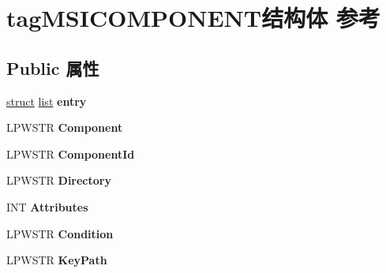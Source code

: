 \hypertarget{structtag_m_s_i_c_o_m_p_o_n_e_n_t}{}\section{tag\+M\+S\+I\+C\+O\+M\+P\+O\+N\+E\+N\+T结构体 参考}
\label{structtag_m_s_i_c_o_m_p_o_n_e_n_t}
\subsection*{Public 属性}
\begin{DoxyCompactItemize}
\item 
\mbox{\label{structtag_m_s_i_c_o_m_p_o_n_e_n_t_a9efeaa4a91aac674706fe3258ff213a9}} 
\hyperlink{interfacestruct}{struct} \hyperlink{classlist}{list} {\bfseries entry}
\item 
\mbox{\label{structtag_m_s_i_c_o_m_p_o_n_e_n_t_a07585d562875d0ee2a2c725a46d3be1d}} 
L\+P\+W\+S\+TR {\bfseries Component}
\item 
\mbox{\label{structtag_m_s_i_c_o_m_p_o_n_e_n_t_a893386b13b5175bab2abe437631274aa}} 
L\+P\+W\+S\+TR {\bfseries Component\+Id}
\item 
\mbox{\label{structtag_m_s_i_c_o_m_p_o_n_e_n_t_ae54cce95a94d71254831aacfcfa97674}} 
L\+P\+W\+S\+TR {\bfseries Directory}
\item 
\mbox{\label{structtag_m_s_i_c_o_m_p_o_n_e_n_t_a51cb664c63c21d3027f7cb9a23942cb9}} 
I\+NT {\bfseries Attributes}
\item 
\mbox{\label{structtag_m_s_i_c_o_m_p_o_n_e_n_t_ad1c35e54cbb938fdd2303d417c12cbd7}} 
L\+P\+W\+S\+TR {\bfseries Condition}
\item 
\mbox{\label{structtag_m_s_i_c_o_m_p_o_n_e_n_t_aa523554c3e7004ebdc6fa72808198a7d}} 
L\+P\+W\+S\+TR {\bfseries Key\+Path}
\item 
\mbox{\label{structtag_m_s_i_c_o_m_p_o_n_e_n_t_adedab76d65cc29398d45a5b108aa6dc8}} 

\end{DoxyCompactItemize}
